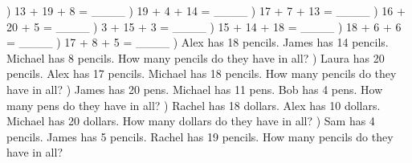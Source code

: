 \documentclass{article}%
\begin{document}
\newline%
) 13 + 19 + 8 = \_\_\_\_%
\newline%
\newline%
) 19 + 4 + 14 = \_\_\_\_%
\newline%
\newline%
) 17 + 7 + 13 = \_\_\_\_%
\newline%
\newline%
) 16 + 20 + 5 = \_\_\_\_%
\newline%
\newline%
) 3 + 15 + 3 = \_\_\_\_%
\newline%
\newline%
) 15 + 14 + 18 = \_\_\_\_%
\newline%
\newline%
) 18 + 6 + 6 = \_\_\_\_%
\newline%
\newline%
) 17 + 8 + 5 = \_\_\_\_%
\newline%
\newline%
) Alex has 18 pencils. James has 14 pencils. Michael has 8 pencils. How many pencils do they have in all?%
\newline%
\newline%
) Laura has 20 pencils. Alex has 17 pencils. Michael has 18 pencils. How many pencils do they have in all?%
\newline%
\newline%
) James has 20 pens. Michael has 11 pens. Bob has 4 pens. How many pens do they have in all?%
\newline%
\newline%
) Rachel has 18 dollars. Alex has 10 dollars. Michael has 20 dollars. How many dollars do they have in all?%
\newline%
\newline%
) Sam has 4 pencils. James has 5 pencils. Rachel has 19 pencils. How many pencils do they have in all?%
\end{document}
